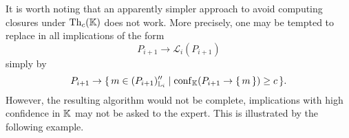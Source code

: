 It is worth noting that an apparently simpler approach to avoid computing closures under
$\operatorname{Th}_{c}({\mathbb{K}})$ does not work.  More precisely, one may be tempted to replace in
 all implications of the form
\begin{equation}
  \label{eq:62}
  P_{i+1} \to \mathcal{L}_{i}(P_{i+1})
\end{equation}
simply by
\begin{equation}
  \label{eq:63}
  P_{i+1} \to {\ensuremath{\{\, m \in (P_{i+1})_{{\mathbb{L}}_{i}}'' \mid \operatorname{conf}_{{\mathbb{K}}}(P_{i+1} \to
    {\ensuremath{\{\, m \,\}}}) \ge c \,\}}}.
\end{equation}
However, the resulting algorithm would not be complete, \ie implications with high
confidence in ${\mathbb{K}}$ may not be asked to the expert.  This is illustrated by the
following example.

